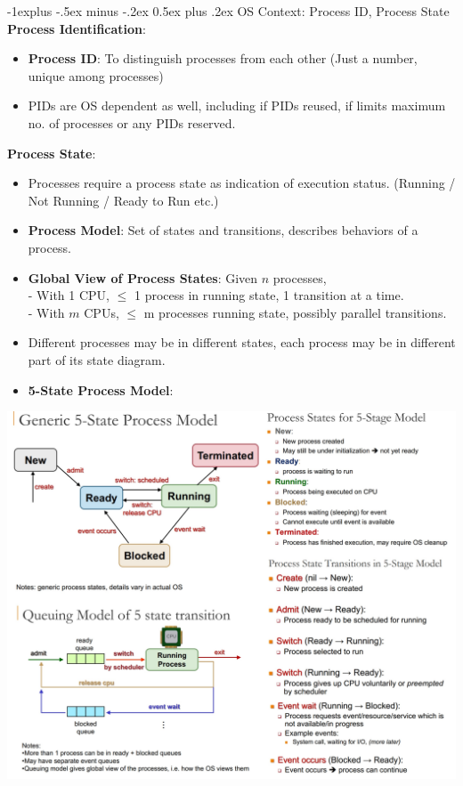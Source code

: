 \documentclass[10pt, landscape]{article}
\makeatletter
\renewcommand{\subsection}{\@startsection{subsection}{2}{0mm}%
                                {-1explus -.5ex minus -.2ex}%
                                {0.5ex plus .2ex}%
                                {\normalfont\normalsize\bfseries}}
\makeatother
\begin{document}
\begin{multicols*}{3}
\subsection{OS Context: Process ID, Process State}
\textbf{Process Identification}:
\begin{itemize}
\item \textbf{Process ID}: To distinguish processes from each other (Just a number, unique among processes)
\item PIDs are OS dependent as well, including if PIDs reused, if limits maximum no. of processes or any PIDs reserved.
\end{itemize}
\textbf{Process State}:
\begin{itemize}
\item Processes require a process state as indication of execution status. (Running / Not Running / Ready to Run etc.)
\item \textbf{Process Model}: Set of states and transitions, describes behaviors of a process.
\item \textbf{Global View of Process States}: Given $n$ processes, \\
- With 1 CPU, $\leq$ 1 process in running state, 1 transition at a time. \\
- With $m$ CPUs, $\leq$ m processes running state, possibly parallel transitions.
\item Different processes may be in different states, each process may be in different part of its state diagram.
\item \textbf{5-State Process Model}: 
\end{itemize}
\centerline{\includegraphics[width=1\linewidth]{5StateProcess}}


\end{multicols*}
\end{document}
